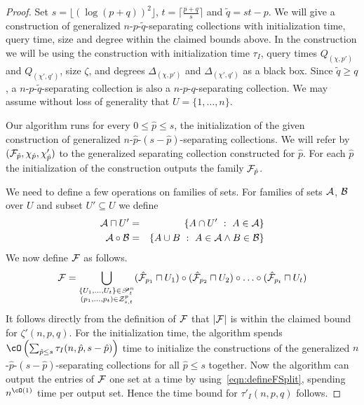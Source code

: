\begin{proof}
Set $s = \lfloor (\log (p+q))^2 \rfloor$, $t = \lceil \frac{p+q}{s} \rceil$ and $\tilde{q} = st - p$. We will give 
a construction of generalized $n$-$p$-$\tilde{q}$-separating collections with initialization time, query time, size and degree 
within the claimed bounds above. In the construction we will be using the construction with initialization time 
$\tau_I$, query times ${Q_{({\chi},p')}}$ and ${Q_{({\chi}',q')}}$, size $\zeta$, and degrees $\Delta_{({\chi},p')}$ 
and $\Delta_{({\chi}',q')}$ as a black box. Since  $\tilde{q} \geq q$, a $n$-$p$-$\tilde{q}$-separating collection 
is also a $n$-$p$-$q$-separating collection. We may assume without loss of generality that $U = \{1, \ldots, n\}$.
 
Our algorithm runs  for every $0\leq\hat{p}\leq s$, the initialization of  the given construction of  generalized 
$n$-$\hat{p}$-$(s-\hat{p})$-separating collections. We will refer by 
$({\cal F}_{\hat{p}}, {\chi}_{\hat{p}}, {\chi}'_{\hat{p}})$ to the generalized separating collection constructed for 
$\hat{p}$. For each $\hat{p}$ the initialization of the construction outputs the family ${\cal F}_{\hat{p}}$. 
 
We need to define a few operations on families of sets. For families of sets  ${\cal A}$, ${\cal B}$ over $U$ 
and subset $U' \subseteq U$ we define
\begin{eqnarray*}
{\cal A} \sqcap U' &=& \{A \cap U'~:~A \in {\cal A}\} \\ 
{\cal A} \circ {\cal B} &=& \{A \cup B ~:~A \in {\cal A} \wedge B \in {\cal B}\} 
\end{eqnarray*}
We now define ${\cal F}$ as follows.
\begin{align}\label{eqn:defineFSplit} 
{\cal F} = \bigcup_{\substack{\{U_1,\ldots,U_{t}\} \in \mathscr{P}_{t}^n \\ (p_1,\ldots,p_t) \in {\cal Z}_{s,t}^{p}}} 
(\hat{\cal F}_{p_1} \sqcap U_1) \circ (\hat{\cal F}_{p_2} \sqcap U_2) \circ \ldots \circ (\hat{\cal F}_{p_t} \sqcap U_{t}) 
\end{align}
It follows directly from the definition of  ${\cal F}$ that $|{\cal F}|$ is within the claimed bound for 
$\zeta'(n,p,q)$. For the initialization time, the algorithm spends 
$\cO\left(\sum_{\substack{\hat{p} \leq s}} \tau_I(n,\hat{p},s-\hat{p})\right)$ time to initialize the constructions 
of the generalized $n$-$\hat{p}$-$(s-\hat{p})$-separating collections for all $\hat{p}\leq s$ together. Now the 
algorithm can output the entries of ${\cal F}$ one set at a time by using~\eqref{eqn:defineFSplit}, spending 
$n^{\cO(1)}$ time per output set. Hence the time bound for $\tau'_I(n,p,q)$ follows. 


\end{proof}
